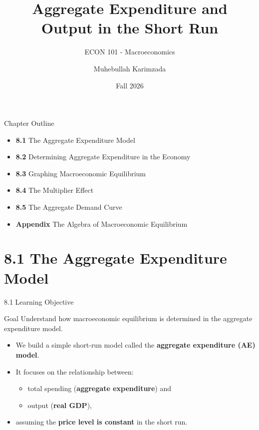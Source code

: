 \documentclass[aspectratio=169]{beamer}
\title{\textbf{Aggregate Expenditure and Output in the Short Run \vspace{.5cm}\\  }}
\subtitle{ {\large ECON 101 - Macroeconomics}}
\author{Muhebullah Karimzada}
\date{Fall 2026}
\begin{document}
\begin{frame}[plain]
  \titlepage
\end{frame}

\begin{frame}{Chapter Outline}
\transfade
\begin{itemize}[<+->]
  \item \textbf{8.1} The Aggregate Expenditure Model
  \item \textbf{8.2} Determining Aggregate Expenditure in the Economy
  \item \textbf{8.3} Graphing Macroeconomic Equilibrium
  \item \textbf{8.4} The Multiplier Effect
  \item \textbf{8.5} The Aggregate Demand Curve
  \item \textbf{Appendix} The Algebra of Macroeconomic Equilibrium
\end{itemize}
\end{frame}

\section{8.1 The Aggregate Expenditure Model}

\begin{frame}{8.1 Learning Objective}
\transfade
\begin{block}{Goal}
Understand how macroeconomic equilibrium is determined in the aggregate expenditure model.
\end{block}
\begin{itemize}[<+->]
  \item We build a simple short-run model called the \textbf{aggregate expenditure (AE) model}.
  \item It focuses on the relationship between:
  \begin{itemize}[<+->]
    \item total spending (\textbf{aggregate expenditure}) and
    \item output (\textbf{real GDP}),
  \end{itemize}
  \item assuming the \textbf{price level is constant} in the short run.
\end{itemize}
\end{frame}
\end{document}
